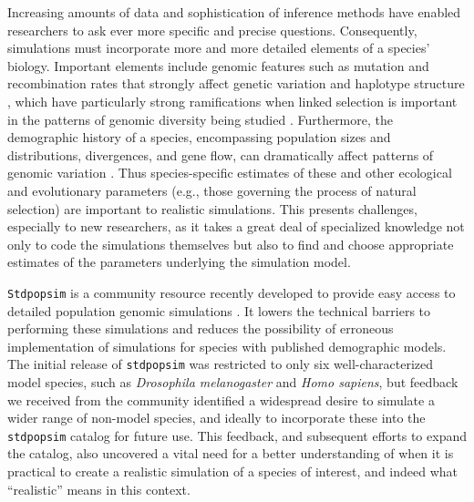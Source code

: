 \documentclass[hidelinks]{article}
\newcommand{\Stdpopsim}{\texttt{Stdpopsim}\xspace}
\newcommand{\stdpopsim}{\texttt{stdpopsim}\xspace}
\begin{document}
Increasing amounts of data and sophistication of inference methods
have enabled researchers to ask ever more
specific and precise questions. Consequently, simulations must incorporate
more and more detailed elements of a species' biology.
Important elements include genomic features such as mutation and recombination
rates that strongly affect genetic variation and haplotype structure
\citep{Nachman2002}, which have particularly strong ramifications 
when linked selection is important in the patterns of genomic diversity being studied \citep{Cutter2013}.
Furthermore, the demographic history of a species,
encompassing population sizes and distributions, divergences, and gene flow, can
dramatically affect patterns of genomic variation \citep{Teshima2006}. Thus
species-specific estimates of these and other ecological and evolutionary parameters 
(e.g., those governing the process of natural selection) 
are important to realistic simulations.
This presents challenges, especially to new researchers,
as it takes a great deal of specialized knowledge not only to code the simulations themselves
but also to find and choose appropriate estimates of the parameters underlying the simulation model.

\Stdpopsim is a community resource recently developed to provide easy
access to detailed population genomic simulations \citep{Adrion2020}. It
lowers the technical barriers to performing these simulations
and reduces the possibility of erroneous implementation of simulations
for species with published demographic models. 
The initial release of \stdpopsim was
restricted to only six well-characterized model species, such as
\emph{Drosophila melanogaster} and \emph{Homo sapiens},
but feedback we received from the community identified a widespread desire
to simulate a wider range of non-model species,
and ideally to incorporate these into the \stdpopsim catalog for future use.
This feedback, and subsequent efforts to expand the catalog, 
also uncovered a vital need for a better understanding of when it is practical to create a realistic
simulation of a species of interest, and indeed what ``realistic'' means in this context.
\end{document}
